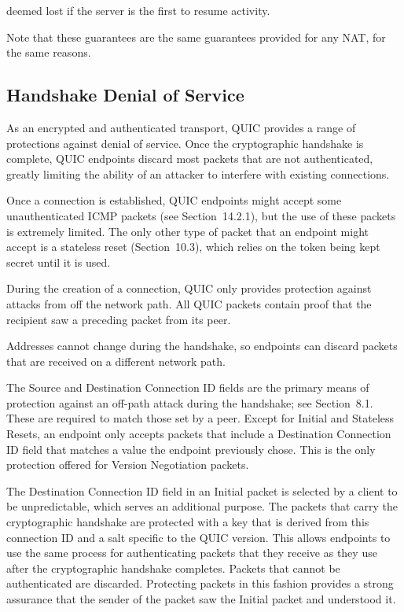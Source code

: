 \documentclass{article}
\begin{document}
deemed lost if the server is the first to resume activity.

Note that these guarantees are the same guarantees provided for any NAT, for the same reasons.

\subsection{Handshake Denial of Service}

As an encrypted and authenticated transport, QUIC provides a range of protections against denial of service.  Once the cryptographic handshake is complete, QUIC endpoints discard most packets that are not authenticated, greatly limiting the ability of an attacker to interfere with existing connections.

Once a connection is established, QUIC endpoints might accept some unauthenticated ICMP packets (see Section~14.2.1), but the use of these packets is extremely limited.  The only other type of packet that an endpoint might accept is a stateless reset (Section~10.3), which relies on the token being kept secret until it is used.

During the creation of a connection, QUIC only provides protection against attacks from off the network path.  All QUIC packets contain proof that the recipient saw a preceding packet from its peer.

Addresses cannot change during the handshake, so endpoints can discard packets that are received on a different network path.

The Source and Destination Connection ID fields are the primary means of protection against an off-path attack during the handshake; see Section~8.1.  These are required to match those set by a peer. Except for Initial and Stateless Resets, an endpoint only accepts packets that include a Destination Connection ID field that matches a value the endpoint previously chose.  This is the only protection offered for Version Negotiation packets.

The Destination Connection ID field in an Initial packet is selected by a client to be unpredictable, which serves an additional purpose. The packets that carry the cryptographic handshake are protected with a key that is derived from this connection ID and a salt specific to the QUIC version.  This allows endpoints to use the same process for authenticating packets that they receive as they use after the cryptographic handshake completes.  Packets that cannot be authenticated are discarded.  Protecting packets in this fashion provides a strong assurance that the sender of the packet saw the Initial packet and understood it.
\end{document}
